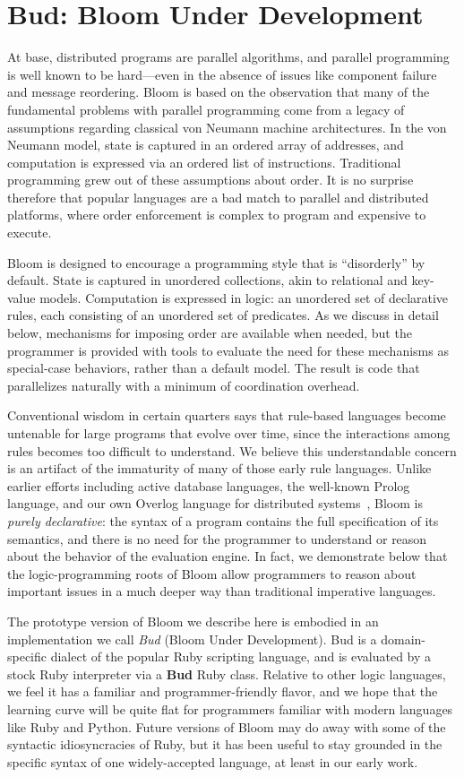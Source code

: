 \section{Bud: Bloom Under Development}
\label{sec:lang}
At base, distributed programs are parallel algorithms, and parallel programming is well known to be hard---even in the absence of issues like component failure and message reordering.  Bloom is based on the observation that many of the fundamental problems with parallel programming come from a legacy of assumptions regarding classical von Neumann machine architectures.  In the von Neumann model, state is captured in an ordered array of addresses, and computation is expressed via an ordered list of instructions.  Traditional programming grew out of these assumptions about order.  It is no surprise therefore that popular languages are a bad match to parallel and distributed platforms, where order enforcement is complex to program and expensive to execute.

Bloom is designed to encourage a programming style that is ``disorderly'' by default.  State is captured in unordered collections, akin to relational and key-value models.  Computation is expressed in logic: an unordered set of declarative rules, each consisting of an unordered set of predicates.  As we discuss in detail below, mechanisms for imposing order are available when needed, but the programmer is provided with tools to evaluate the need for these mechanisms as special-case behaviors, rather than a default model.  The result is code that parallelizes naturally with a minimum of coordination overhead.

Conventional wisdom in certain quarters says that rule-based languages become untenable for large programs that evolve over time, since the interactions among rules becomes too difficult to understand.  We believe this understandable concern is an artifact of the immaturity of many of those early rule languages. Unlike earlier efforts including active database languages, the well-known Prolog language, and our own Overlog language for distributed systems~\cite{p2}, Bloom is {\em purely declarative}: the syntax of a program contains the full specification of its semantics, and there is no need for the programmer to understand or reason about the behavior of the evaluation engine.  In fact, we demonstrate below that the logic-programming roots of Bloom allow programmers to reason about important issues in a much deeper way than traditional imperative languages.  

The prototype version of Bloom we describe here is embodied in an implementation we call {\em Bud} (Bloom Under Development).  Bud is a domain-specific dialect of the popular Ruby scripting language, and is evaluated by a stock Ruby interpreter via a {\bf Bud} Ruby class.  Relative to other logic languages, we feel it has a familiar and programmer-friendly flavor, and we hope that the learning curve will be quite flat for programmers familiar with modern languages like Ruby and Python.  Future versions of Bloom may do away with some of the syntactic idiosyncracies of Ruby, but it has been useful to stay grounded in the specific syntax of one widely-accepted language, at least in our early work.

